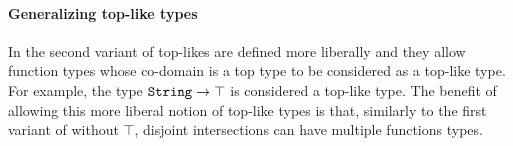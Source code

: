 \paragraph{Generalizing top-like types} In the second variant of \name 
top-likes are defined more liberally and they allow function types
whose co-domain is a top type to be considered as a top-like type.
For example, the type $\texttt{String}\to\top$ is considered a top-like
type. The benefit of allowing this more liberal notion of top-like
types is that, similarly to the first variant of \name without $\top$, 
disjoint intersections can have multiple functions types. 





 


